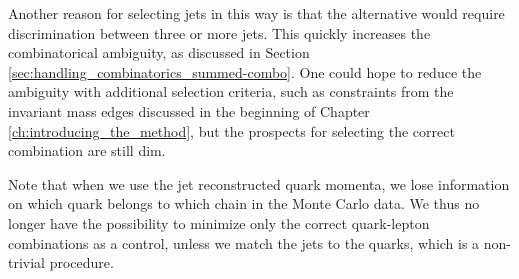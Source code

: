 \documentclass[twoside,english]{uiofysmaster}
\begin{document}


Another reason for selecting jets in this way is that the alternative would require discrimination between three or more jets. This quickly increases the combinatorical ambiguity, as discussed in Section \ref{sec:handling_combinatorics_summed-combo}. One could hope to reduce the ambiguity with additional selection criteria, such as constraints from the invariant mass edges discussed in the beginning of Chapter \ref{ch:introducing_the_method}, but the prospects for selecting the correct combination are still dim.

Note that when we use the jet reconstructed quark momenta, we lose information on which quark belongs to which chain in the Monte Carlo data. We thus no longer have the possibility to minimize only the correct quark-lepton combinations as a control, unless we match the jets to the quarks, which is a non-trivial procedure. 
\end{document}
